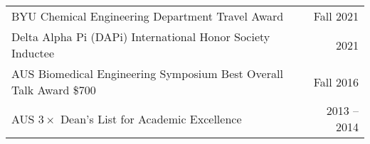 \documentclass[letterpaper,11pt]{article}
\begin{document}
\begin{longtable}{@{}p{}r@{}}
  \hspace{3mm} BYU Chemical Engineering Department Travel Award                                                                                                                                                                                     & Fall 2021    \\ [4pt] %
  \hspace{3mm} Delta Alpha Pi (DAPi) International Honor Society Inductee                                                                                                                                                                           & 2021         \\ [4pt]
  \hspace{3mm} AUS Biomedical Engineering Symposium Best Overall Talk Award \$700                                                                                                                                                                   & Fall 2016    \\ [4pt]
  \hspace{3mm} AUS $3\times$ Dean's List for Academic Excellence                                                                                                                                                                                    & 2013 -- 2014 \\ [4pt]
\end{longtable}


\end{document}
